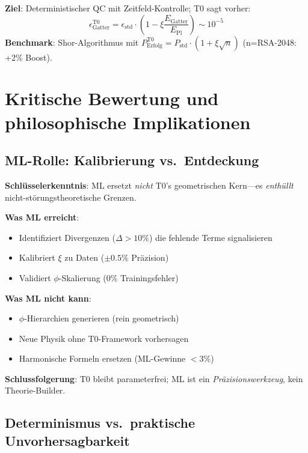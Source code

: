 	\textbf{Ziel}: Deterministischer QC mit Zeitfeld-Kontrolle; T0 sagt vorher:
	\begin{equation}
		\epsilon_{\text{Gatter}}^{\text{T0}} = \epsilon_{\text{std}} \cdot \left(1 - \xi \frac{E_{\text{Gatter}}}{E_{\text{Pl}}}\right) \sim 10^{-5} \tag{T0-Orig Gl.~5.2.1}
	\end{equation}
	\textbf{Benchmark}: Shor-Algorithmus mit $P_{\text{Erfolg}}^{\text{T0}} = P_{\text{std}} \cdot (1 + \xi\sqrt{n})$ (n=RSA-2048: +2\% Boost).
	
	\section{Kritische Bewertung und philosophische Implikationen}
	
	\subsection{ML-Rolle: Kalibrierung vs.~Entdeckung}
	
	\textbf{Schlüsselerkenntnis}: ML ersetzt \textit{nicht} T0's geometrischen Kern—es \textit{enthüllt} nicht-störungstheoretische Grenzen.
	
	\begin{tcolorbox}[colback=red!5!white,colframe=red!75!black,title={ML-Grenzen in T0}]
		\textbf{Was ML erreicht}:
		\begin{itemize}
			\item Identifiziert Divergenzen ($\Delta>10\%$) die fehlende Terme signalisieren
			\item Kalibriert $\xi$ zu Daten ($\pm0.5\%$ Präzision)
			\item Validiert $\phi$-Skalierung (0\% Trainingsfehler)
		\end{itemize}
		\textbf{Was ML nicht kann}:
		\begin{itemize}
			\item $\phi$-Hierarchien generieren (rein geometrisch)
			\item Neue Physik ohne T0-Framework vorhersagen
			\item Harmonische Formeln ersetzen (ML-Gewinne $<3\%$)
		\end{itemize}
	\end{tcolorbox}
	
	\textbf{Schlussfolgerung}: T0 bleibt parameterfrei; ML ist ein \textit{Präzisionswerkzeug}, kein Theorie-Builder.
	
	\subsection{Determinismus vs.~praktische Unvorhersagbarkeit}
	
